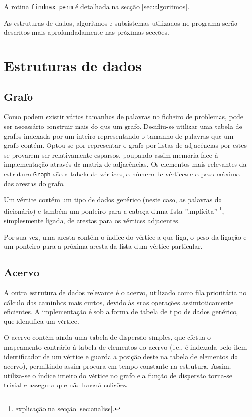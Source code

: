 \documentclass[portuguese, a4paper]{article}
\newcommand\tu[0]{\textunderscore}
\begin{document}
	\par
	A rotina \texttt{find\tu max \tu perm} é detalhada na secção \ref{sec:algoritmos}.
	\par
	As estruturas de dados, algoritmos e subsistemas utilizados no programa
	serão descritos mais aprofundadamente nas próximas secções.

\section{Estruturas de dados}
	\subsection{Grafo}
	\par
	Como podem existir vários tamanhos de palavras no ficheiro de problemas,
	pode ser necessário construir mais do que um grafo. Decidiu-se utilizar uma
	tabela de grafos indexada por um inteiro representando o tamanho de palavras
	que um grafo contém. Optou-se por representar o grafo por listas de
	adjacências por estes se provarem ser relativamente esparsos, poupando assim
	memória face à implementação através de matriz de adjacências. Os elementos
	mais relevantes da estrutura \texttt{Graph} são a tabela de vértices, o
	número de vértices e o peso máximo das arestas do grafo.
	\par
	Um vértice contém um tipo de dados genérico (neste caso, as palavras do
	dicionário) e também um ponteiro para a cabeça duma lista ''implícita''
	\footnote{explicação na secção \ref{sec:analise}.}, simplesmente ligada, de
	arestas para os vértices adjacentes.
	\par
	Por sua vez, uma aresta contém o índice do vértice a que liga, o peso da
	ligação e um ponteiro para a próxima aresta da lista dum vértice
	particular.

	\subsection{Acervo}
	\par\null\par
	A outra estrutura de dados relevante é o acervo, utilizado como fila
	prioritária no cálculo dos caminhos mais curtos, devido às suas operações
	assimtoticamente eficientes. A implementação é sob a forma de tabela de tipo
	de dados genérico, que identifica um vértice.
	\par
	O acervo contém ainda uma tabela de dispersão simples, que efetua o
	mapeamento contrário à tabela de elementos do acervo (i.e., é indexada pelo
	item identificador de um vértice e guarda a posição deste na tabela de
	elementos do acervo), permitindo assim procura em tempo constante na
	estrutura. Assim, utiliza-se o índice inteiro do vértice no grafo e a função
	de dispersão torna-se trivial e assegura que não haverá colisões.
\end{document}
